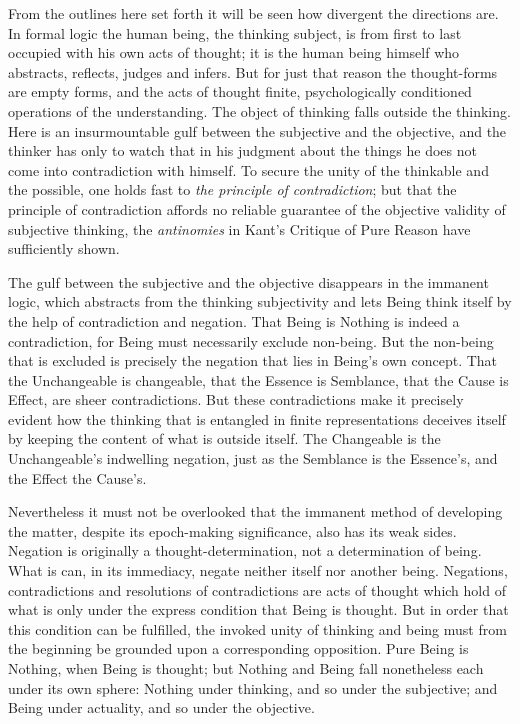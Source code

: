 \documentclass[12pt]{book}
\begin{document}
From the outlines here set forth it will be seen how divergent the
directions are. In formal logic the human being, the thinking
subject, is from first to last occupied with his own acts of thought;
it is the human being himself who abstracts, reflects, judges and
infers. But for just that reason the thought-forms are empty forms,
and the acts of thought finite, psychologically conditioned
operations of the understanding. The object of thinking falls outside
the thinking. Here is an insurmountable gulf between the subjective
and the objective, and the thinker has only to watch that in his
judgment about the things he does not come into contradiction with
himself. To secure the unity of the thinkable and the possible, one
holds fast to \emph{the principle of contradiction}; but that the
principle of contradiction affords no reliable guarantee of the
objective validity of subjective thinking, the \emph{antinomies} in
Kant's Critique of Pure Reason have sufficiently shown.

The gulf between the subjective and the objective disappears in the
immanent logic, which abstracts from the thinking subjectivity and
lets Being think itself by the help of contradiction and negation.
That Being is Nothing is indeed a contradiction, for Being must
necessarily exclude non-being. But the non-being that is excluded is
precisely the negation that lies in Being's own concept. That the
Unchangeable is changeable, that the Essence is Semblance, that the
Cause is Effect, are sheer contradictions. But these contradictions
make it precisely evident how the thinking that is entangled in
finite representations deceives itself by keeping the content of what
is outside itself. The Changeable is the Unchangeable's indwelling
negation, just as the Semblance is the Essence's, and the Effect the
Cause's.

Nevertheless it must not be overlooked that the immanent method of
developing the matter, despite its epoch-making significance, also
has its weak sides. Negation is originally a thought-determination,
not a determination of being. What is can, in its immediacy, negate
neither itself nor another being. Negations, contradictions and
resolutions of contradictions are acts of thought which hold of what
is only under the express condition that Being is thought. But in
order that this condition can be fulfilled, the invoked unity of
thinking and being must from the beginning be grounded upon a
corresponding opposition. Pure Being is Nothing, when Being is
thought; but Nothing and Being fall nonetheless each under its own
sphere: Nothing under thinking, and so under the subjective; and
Being under actuality, and so under the objective.
\end{document}
